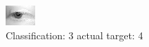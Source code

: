 \begin{figure}[h!]
\begin{center}
\includegraphics[width=0.60\columnwidth]{figures/ID2650_class_3_target_4.png}
\end{center}
\caption{ Classification: 3 actual target: 4}
\label{fig:ID2650_class_3_target_4}
\end{figure}
